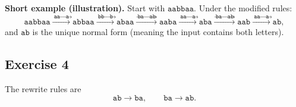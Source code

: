 \documentclass[12pt]{article}
\begin{document}
\bigskip

\textbf{Short example (illustration).} Start with \(\texttt{aabbaa}\). Under the modified rules:
\[
\texttt{aabbaa}\xrightarrow{\ \texttt{aa}\to\texttt{a}\ } \texttt{abbaa}
\xrightarrow{\ \texttt{bb}\to\texttt{b}\ } \texttt{abaa}
\xrightarrow{\ \texttt{ba}\to\texttt{ab}\ } \texttt{aaba}
\xrightarrow{\ \texttt{aa}\to\texttt{a}\ } \texttt{aba}
\xrightarrow{\ \texttt{ba}\to\texttt{ab}\ } \texttt{aab}
\xrightarrow{\ \texttt{aa}\to\texttt{a}\ } \texttt{ab},
\]
and \(\texttt{ab}\) is the unique normal form (meaning the input contains both letters).

\subsection*{Exercise 4}

The rewrite rules are
\[
\texttt{ab}\to\texttt{ba},\qquad
\texttt{ba}\to\texttt{ab}.
\]
\end{document}
